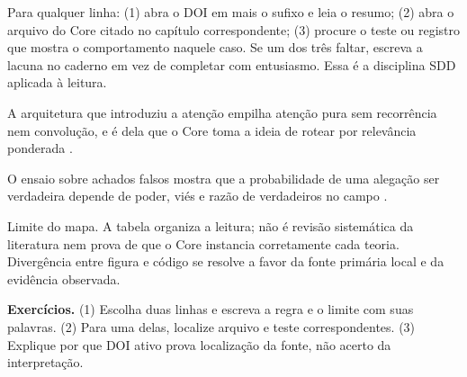 \begin{metodo}
Para qualquer linha: (1) abra o DOI em  mais o sufixo e leia o resumo; (2) abra o arquivo do Core citado no capítulo correspondente; (3) procure o teste ou registro que mostra o comportamento naquele caso. Se um dos três faltar, escreva a lacuna no caderno em vez de completar com entusiasmo. Essa é a disciplina SDD aplicada à leitura.
\end{metodo}

A arquitetura que introduziu a atenção empilha atenção pura sem recorrência nem convolução, e é dela que o Core toma a ideia de rotear por relevância ponderada .

O ensaio sobre achados falsos mostra que a probabilidade de uma alegação ser verdadeira depende de poder, viés e razão de verdadeiros no campo .

\begin{aviso}
Limite do mapa. A tabela organiza a leitura; não é revisão sistemática da literatura nem prova de que o Core instancia corretamente cada teoria. Divergência entre figura e código se resolve a favor da fonte primária local e da evidência observada.
\end{aviso}

\begin{resultado}
\textbf{Exercícios.} (1) Escolha duas linhas e escreva a regra e o limite com suas palavras. (2) Para uma delas, localize arquivo e teste correspondentes. (3) Explique por que DOI ativo prova localização da fonte, não acerto da interpretação.
\end{resultado}

